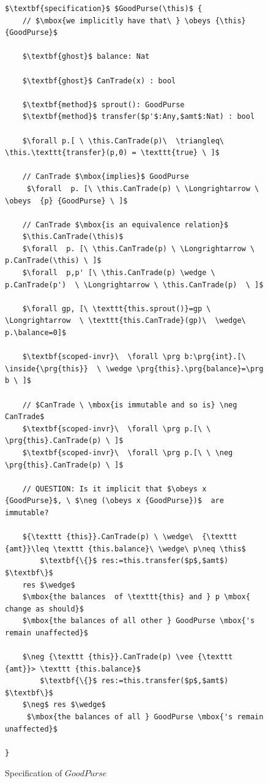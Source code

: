 \renewcommand{\this}{\texttt{this}}
\renewcommand{\balance}{\texttt{balance}}
 
  \begin{figure}[t]
\begin{lstlisting}[mathescape=true, language=Chainmail, frame=lines]
$\textbf{specification}$ $GoodPurse(\this)$ {
    // $\mbox{we implicitly have that\ } \obeys {\this} {GoodPurse}$
    
    $\textbf{ghost}$ balance: Nat
     
    $\textbf{ghost}$ CanTrade(x) : bool
    
    $\textbf{method}$ sprout(): GoodPurse
    $\textbf{method}$ transfer($p'$:Any,$amt$:Nat) : bool
     
    $\forall p.[ \ \this.CanTrade(p)\  \triangleq\ \this.\texttt{transfer}(p,0) = \texttt{true} \ ]$
     
    // CanTrade $\mbox{implies}$ GoodPurse
     $\forall  p. [\ \this.CanTrade(p) \ \Longrightarrow \ \obeys  {p} {GoodPurse} \ ]$
       
    // CanTrade $\mbox{is an equivalence relation}$
    $\this.CanTrade(\this)$
    $\forall  p. [\ \this.CanTrade(p) \ \Longrightarrow \ p.CanTrade(\this) \ ]$
    $\forall  p,p' [\ \this.CanTrade(p) \wedge \ p.CanTrade(p')  \ \Longrightarrow \ \this.CanTrade(p)  \ ]$
       
    $\forall gp, [\ \texttt{this.sprout()}=gp \ \Longrightarrow  \ \texttt{this.CanTrade}(gp)\  \wedge\  p.\balance=0]$
    
    $\textbf{scoped-invr}\  \forall \prg b:\prg{int}.[\ \inside{\prg{this}}  \ \wedge \prg{this}.\prg{balance}=\prg b \ ]$ 
    
    // $CanTrade \ \mbox{is immutable and so is} \neg CanTrade$
    $\textbf{scoped-invr}\  \forall \prg p.[\ \ \prg{this}.CanTrade(p) \ ]$ 
    $\textbf{scoped-invr}\  \forall \prg p.[\ \ \neg \prg{this}.CanTrade(p) \ ]$ 
    
    // QUESTION: Is it implicit that $\obeys x {GoodPurse}$, \ $\neg (\obeys x {GoodPurse})$  are immutable?
         
    ${\texttt {this}}.CanTrade(p) \ \wedge\  {\texttt {amt}}\leq \texttt {this.balance}\ \wedge\ p\neq \this$
        $\textbf{\{}$ res:=this.transfer($p$,$amt$) $\textbf\}$
    res $\wedge$
    $\mbox{the balances  of \texttt{this} and } p \mbox{ change as should}$
    $\mbox{the balances of all other } GoodPurse \mbox{'s remain unaffected}$
     
    $\neg {\texttt {this}}.CanTrade(p) \vee {\texttt {amt}}> \texttt {this.balance}$
        $\textbf{\{}$ res:=this.transfer($p$,$amt$) $\textbf\}$
    $\neg$ res $\wedge$
     $\mbox{the balances of all } GoodPurse \mbox{'s remain unaffected}$
     
}
\end{lstlisting}
\caption{Specification of  $GoodPurse$ }
\label{fig:GoodPurse}
 \end{figure}
 
